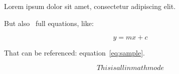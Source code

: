 Lorem ipsum dolor sit amet, consectetur adipiscing elit.

But also~\cite{minsky2017perceptrons} full equations, like:

\begin{equation}
	\label{eq:sample}
	y = mx + c
\end{equation}

That can be referenced: equation~\ref{eq:sample}.

$$This is all in math mode$$


